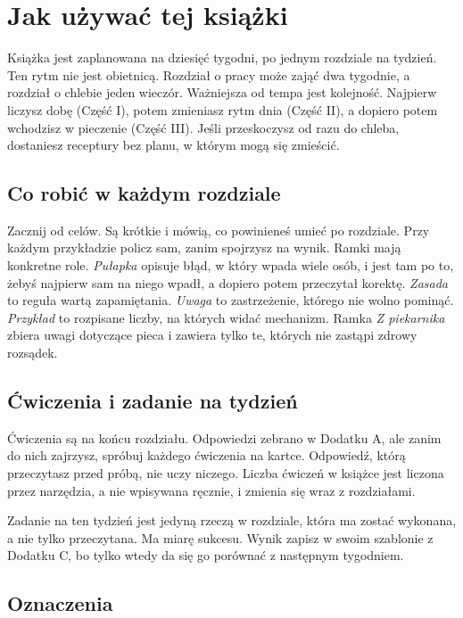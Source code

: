 \chapter*{Jak używać tej książki}

Książka jest zaplanowana na dziesięć tygodni, po jednym rozdziale na tydzień. Ten rytm nie jest obietnicą. Rozdział o pracy może zająć dwa tygodnie, a rozdział o chlebie jeden wieczór. Ważniejsza od tempa jest kolejność. Najpierw liczysz dobę (Część I), potem zmieniasz rytm dnia (Część II), a dopiero potem wchodzisz w pieczenie (Część III). Jeśli przeskoczysz od razu do chleba, dostaniesz receptury bez planu, w którym mogą się zmieścić.

\section*{Co robić w każdym rozdziale}

Zacznij od celów. Są krótkie i mówią, co powinieneś umieć po rozdziale. Przy każdym przykładzie policz sam, zanim spojrzysz na wynik. Ramki mają konkretne role. \emph{Pułapka} opisuje błąd, w który wpada wiele osób, i jest tam po to, żebyś najpierw sam na niego wpadł, a dopiero potem przeczytał korektę. \emph{Zasada} to reguła wartą zapamiętania. \emph{Uwaga} to zastrzeżenie, którego nie wolno pominąć. \emph{Przykład} to rozpisane liczby, na których widać mechanizm. Ramka \emph{Z piekarnika} zbiera uwagi dotyczące pieca i zawiera tylko te, których nie zastąpi zdrowy rozsądek.

\section*{Ćwiczenia i zadanie na tydzień}

Ćwiczenia są na końcu rozdziału. Odpowiedzi zebrano w Dodatku A, ale zanim do nich zajrzysz, spróbuj każdego ćwiczenia na kartce. Odpowiedź, którą przeczytasz przed próbą, nie uczy niczego. Liczba ćwiczeń w książce jest liczona przez narzędzia, a nie wpisywana ręcznie, i zmienia się wraz z rozdziałami.

Zadanie na ten tydzień jest jedyną rzeczą w rozdziale, która ma zostać wykonana, a nie tylko przeczytana. Ma miarę sukcesu. Wynik zapisz w swoim szablonie z Dodatku C, bo tylko wtedy da się go porównać z następnym tygodniem.

\section*{Oznaczenia}

